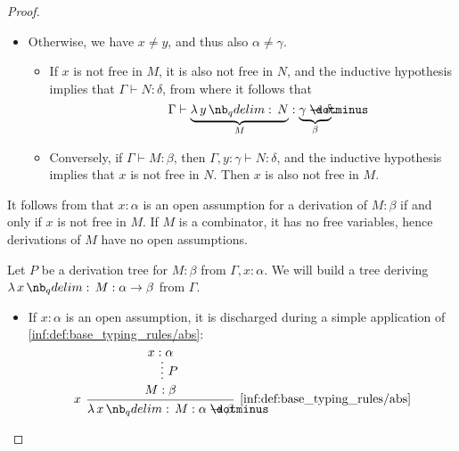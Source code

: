 \begin{proof}
\begin{itemize}
\begin{itemize}
      \item Otherwise, we have \( x \neq y \), and thus also \( \alpha \neq \gamma \).

      \begin{itemize}
        \item If \( x \) is not free in \( M \), it is also not free in \( N \), and the inductive hypothesis implies that \( \Gamma \vdash N: \delta \), from where it follows that
        \begin{equation*}
          \Gamma \vdash \underbrace{\qabs y N}_M: \underbrace{\gamma \synimplies \delta}_\beta.
        \end{equation*}

        \item Conversely, if \( \Gamma \vdash M: \beta \), then \( \Gamma, y: \gamma \vdash N: \delta \), and the inductive hypothesis implies that \( x \) is not free in \( N \). Then \( x \) is also not free in \( M \).
      \end{itemize}
    \end{itemize}
  \end{itemize}

   It follows from  that \( x: \alpha \) is an open assumption for a derivation of \( M: \beta \) if and only if \( x \) is not free in \( M \). If \( M \) is a combinator, it has no free variables, hence derivations of \( M \) have no open assumptions.


  \SufficiencySubProof* Let \( P \) be a derivation tree for \( M: \beta \) from \( \Gamma, x: \alpha \). We will build a tree deriving \( \qabs x M: \alpha \to \beta \) from \( \Gamma \).

  \begin{itemize}
    \item If \( x: \alpha \) is an open assumption, it is discharged during a simple application of \ref{inf:def:base_typing_rules/abs}:
    \begin{equation*}
      \begin{prooftree}
        \hypo{ x: \alpha }
        \ellipsis { \( P \) } { M: \beta }
        \infer[left label=\( x \)]1[\ref{inf:def:base_typing_rules/abs}]{ \qabs x M: \alpha \synimplies \beta }
      \end{prooftree}
    \end{equation*}


\end{itemize}
\end{proof}
